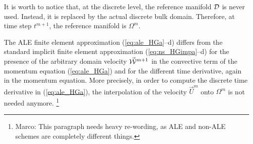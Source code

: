 It is worth to notice that, at the discrete level, the reference manifold $\mathcal D$
is never used. Instead, it is replaced by the actual discrete bulk domain.
Therefore, at time step $t^{m+1}$, the reference manifold is $\Omega^m$.

The ALE finite element approximation (\ref{eq:ale_HGa}--d)
differs from the standard implicit finite element approximation
(\ref{eq:ns_HGimpa}--d) for the presence of the arbitrary domain
velocity $\vec{\mathcal W}^{m+1}$ in the convective term of the momentum equation
(\ref{eq:ale_HGa}) and for the different time derivative, again in the momentum
equation. More precisely, in order to compute the discrete time derivative in
(\ref{eq:ale_HGa}), the interpolation of the velocity $\vec U^m$ onto
$\Omega^m$ is not needed anymore.
\footnote{Marco: This paragraph needs heavy re-wording, as ALE and non-ALE
schemes are completely different things.}

